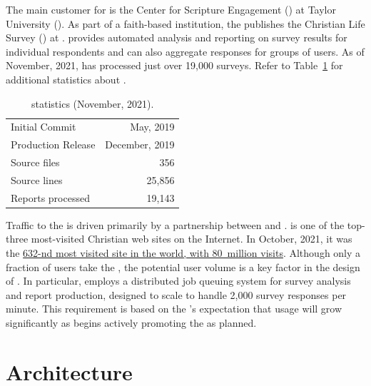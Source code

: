 \documentclass{article}
\begin{document}
The main customer for \caper{}
is the
Center for Scripture Engagement
(\cfse)
at Taylor University (\tu).
As part of a faith-based institution,
the \cfse{} publishes the
Christian Life Survey
(\cls)
at \qual.
\caper{} provides automated analysis and reporting on survey results
for individual respondents and
can also aggregate responses for groups of users.
As of November, 2021,
\caper{} has processed just over 19,000 surveys.
Refer to Table~\ref{tab:caper-stats} for additional statistics about \caper.

\begin{table}[h]
  \centering
  \begin{tabular}{lr}
    \toprule
    Initial Commit     & May, 2019      \\
    Production Release & December, 2019 \\
    \midrule
    Source files       & 356            \\
    Source lines       & 25,856         \\
    \midrule
    Reports processed  & 19,143         \\
    \bottomrule
  \end{tabular}
  \caption{\caper{} statistics (November, 2021).}
  \label{tab:caper-stats}
\end{table}

Traffic to the \cls{} is driven primarily by a partnership between \cfse{} and
\bg.
\bg{} is one of the top-three most-visited Christian web sites on the Internet.
In October, 2021, it was the
\href{https://www.similarweb.com/website/biblegateway.com/}{632-nd most visited site in the world,
  with 80~million visits}.
Although only a fraction of \bg{} users take the \cls,
the potential user volume is a key factor in the design of \caper.
In particular, \caper{} employs a distributed job queuing system
for survey analysis and report production,
designed to scale to handle 2,000 survey responses per minute.
This requirement is based on the \cfse{}'s
expectation that usage will grow significantly as \bg{}
begins actively promoting the \cls{} as planned.

\section{Architecture}
\label{sec:architecture}
\end{document}
